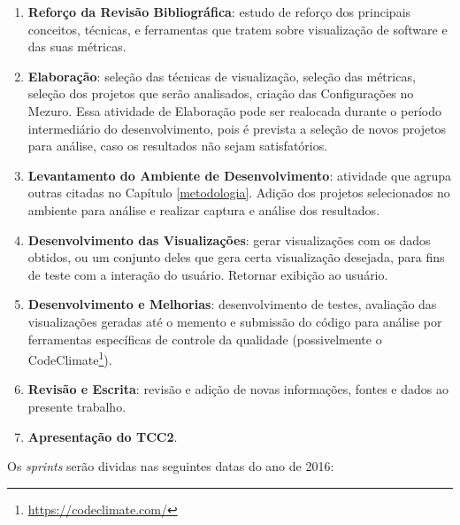 \begin{enumerate}[label=(\alph*)]
\item \textbf{Reforço da Revisão Bibliográfica}: estudo de reforço dos
principais conceitos, técnicas, e ferramentas que tratem sobre visualização de
software e das suas métricas.
\item \textbf{Elaboração}: seleção das técnicas de visualização, seleção das
métricas, seleção dos projetos que serão analisados, criação das Configurações
no Mezuro. Essa atividade de Elaboração pode ser realocada durante o período
intermediário do desenvolvimento, pois é prevista a seleção de novos projetos
para análise, caso os resultados não sejam satisfatórios.
\item \textbf{Levantamento do Ambiente de Desenvolvimento}: atividade que
agrupa outras citadas no Capítulo \ref{metodologia}. Adição dos projetos
selecionados no ambiente para análise e realizar captura e análise dos
resultados.
\item \textbf{Desenvolvimento das Visualizações}: gerar visualizações com os
dados obtidos, ou um conjunto deles que gera certa visualização desejada, para
fins de teste com a interação do usuário. Retornar exibição ao usuário.
\item \textbf{Desenvolvimento e Melhorias}: desenvolvimento de testes, avaliação
das visualizações geradas até o memento e submissão do código para análise por
ferramentas específicas de controle da qualidade (possivelmente o
CodeClimate\footnote{\url{https://codeclimate.com/}}).
\item \textbf{Revisão e Escrita}: revisão e adição de novas informações, fontes
e dados ao presente trabalho.
\item \textbf{Apresentação do TCC2}.
\end{enumerate}

Os \textit{sprints} serão dividas nas seguintes datas do ano de 2016:

